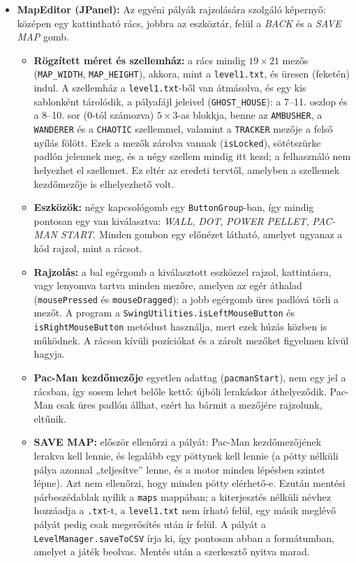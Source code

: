 \documentclass[11pt, a4paper]{article}
\begin{document}
\begin{itemize}
    \item \textbf{MapEditor (JPanel):} Az egyéni pályák rajzolására szolgáló képernyő: középen egy kattintható rács, jobbra az eszköztár, felül a \textit{BACK} és a \textit{SAVE MAP} gomb.
    \begin{itemize}
        \item \textbf{Rögzített méret és szellemház:} a rács mindig $19 \times 21$ mezős (\texttt{MAP\_WIDTH}, \texttt{MAP\_HEIGHT}), akkora, mint a \texttt{level1.txt}, és üresen (feketén) indul. A szellemház a \texttt{level1.txt}-ből van átmásolva, és egy kis sablonként tárolódik, a pályafájl jeleivel (\texttt{GHOST\_HOUSE}): a 7--11. oszlop és a 8--10. sor (0-tól számozva) $5 \times 3$-as blokkja, benne az \texttt{AMBUSHER}, a \texttt{WANDERER} és a \texttt{CHAOTIC} szellemmel, valamint a \texttt{TRACKER} mezője a felső nyílás fölött. Ezek a mezők zárolva vannak (\texttt{isLocked}), sötétszürke padlón jelennek meg, és a négy szellem mindig itt kezd; a felhasználó nem helyezhet el szellemet. Ez eltér az eredeti tervtől, amelyben a szellemek kezdőmezője is elhelyezhető volt.
        \item \textbf{Eszközök:} négy kapcsológomb egy \texttt{ButtonGroup}-ban, így mindig pontosan egy van kiválasztva: \textit{WALL}, \textit{DOT}, \textit{POWER PELLET}, \textit{PAC-MAN START}. Minden gombon egy előnézet látható, amelyet ugyanaz a kód rajzol, mint a rácsot.
        \item \textbf{Rajzolás:} a bal egérgomb a kiválasztott eszközzel rajzol, kattintásra, vagy lenyomva tartva minden mezőre, amelyen az egér áthalad (\texttt{mousePressed} és \texttt{mouseDragged}); a jobb egérgomb üres padlóvá törli a mezőt. A program a \texttt{SwingUtilities.isLeftMouseButton} és \texttt{isRightMouseButton} metódust használja, mert ezek húzás közben is működnek. A rácson kívüli pozíciókat és a zárolt mezőket figyelmen kívül hagyja.
        \item \textbf{Pac-Man kezdőmezője} egyetlen adattag (\texttt{pacmanStart}), nem egy jel a rácsban, így sosem lehet belőle kettő: újbóli lerakáskor áthelyeződik. Pac-Man csak üres padlón állhat, ezért ha bármit a mezőjére rajzolunk, eltűnik.
        \item \textbf{SAVE MAP:} először ellenőrzi a pályát: Pac-Man kezdőmezőjének lerakva kell lennie, és legalább egy pöttynek kell lennie (a pötty nélküli pálya azonnal „teljesítve” lenne, és a motor minden lépésben szintet lépne). Azt nem ellenőrzi, hogy minden pötty elérhető-e. Ezután mentési párbeszédablak nyílik a \texttt{maps} mappában; a kiterjesztés nélküli névhez hozzáadja a \texttt{.txt}-t, a \texttt{level1.txt} nem írható felül, egy másik meglévő pályát pedig csak megerősítés után ír felül. A pályát a \texttt{LevelManager.saveToCSV} írja ki, így pontosan abban a formátumban, amelyet a játék beolvas. Mentés után a szerkesztő nyitva marad.

\end{itemize}
\end{itemize}
\end{document}
